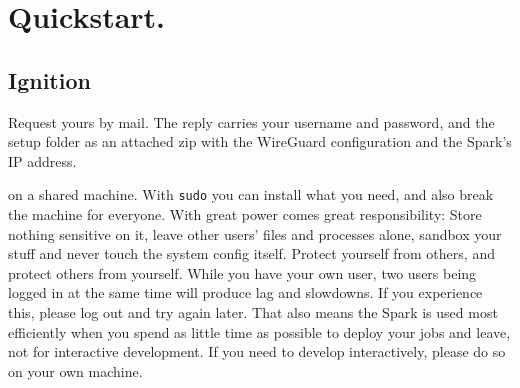%

\chapter{Quickstart.}

\section{Ignition}

%
Request yours by mail. The reply carries your username and
password, and the setup folder as an attached zip with the WireGuard
configuration and the Spark's IP address.

 on a shared machine. With \texttt{sudo} you can install what
you need, and also break the machine for everyone. With great power comes great
responsibility: Store nothing sensitive on it, leave other users' files and
processes alone, sandbox your stuff and never touch the system config itself. 
Protect yourself from others, and protect others from yourself. 
While you have your own user, two users being logged in at the same time
will produce lag and slowdowns. If you experience this, please log out and try again later.
%
That also means the Spark is used most efficiently when you spend as little time as possible to deploy your jobs and leave, 
not for interactive development. If you need to develop interactively, please do so on your own machine.


